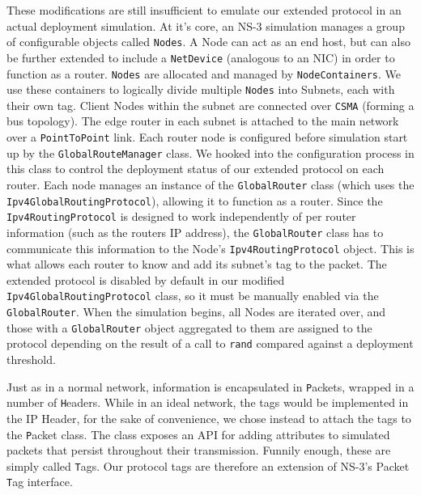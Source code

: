\documentclass[12pt]{article} %
\newcommand{\prettycode}[1]
{\lstinline[basicstyle=\ttfamily]{#1}}
\begin{document}
These modifications are still insufficient to emulate our extended protocol in an actual deployment simulation. At it's core, an NS-3 simulation manages a group of configurable objects called \prettycode{Nodes}. A Node can act as an end host, but can also be further extended to include a \prettycode{NetDevice} (analogous to an NIC) in order to function as a router. \prettycode{Nodes} are allocated and managed by \prettycode{NodeContainers}. We use these containers to logically divide multiple \prettycode{Nodes} into Subnets, each with their own tag. Client Nodes within the subnet are connected over \prettycode{CSMA} (forming a bus topology). The edge router in each subnet is attached to the main network over a \prettycode{PointToPoint} link. Each router node is configured before simulation start up by the \prettycode{GlobalRouteManager} class. We hooked into the configuration process in this class to control the deployment status of our extended protocol on each router. Each node manages an instance of the \prettycode{GlobalRouter} class (which uses the \prettycode{Ipv4GlobalRoutingProtocol}), allowing it to function as a router. Since the \prettycode{Ipv4RoutingProtocol} is designed to work independently of per router information (such as the routers IP address), the \prettycode{GlobalRouter} class has to communicate this information to the Node's \prettycode{Ipv4RoutingProtocol} object. This is what allows each router to know and add its subnet's tag to the packet. The extended protocol is disabled by default in our modified \prettycode{Ipv4GlobalRoutingProtocol} class, so it must be manually enabled via the \prettycode{GlobalRouter}. When the simulation begins, all Nodes are iterated over, and those with a \prettycode{GlobalRouter} object aggregated to them are assigned to the protocol depending on the result of a call to \prettycode{rand} compared against a deployment threshold.

Just as in a normal network, information is encapsulated in {\prettycode Packets}, wrapped in a number of {\prettycode Headers}. While in an ideal network, the tags would be implemented in the IP Header, for the sake of convenience, we chose instead to attach the tags to the {\prettycode Packet} class. The class exposes an API for adding attributes to simulated packets that persist throughout their transmission. Funnily enough, these are simply called {\prettycode Tags}. Our protocol tags are therefore an extension of NS-3's Packet {\prettycode Tag} interface.
\end{document}

